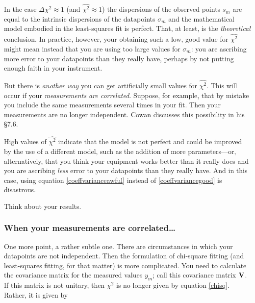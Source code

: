 \documentclass[psfig,preprint]{aastex}
\begin{document}
	In the case $\Delta \chi^2 \approx 1$ (and $\widehat{\chi^2}
\approx 1$) the dispersions of the observed points $s_m$ are equal to
the intrinsic dispersions of the datapoints $\sigma_{m}$ and the
mathematical model embodied in the least-squares fit is perfect.  That,
at least, is the {\it theoretical} conclusion.  In practice, however,
your obtaining such a low, good value for $\widehat{\chi^2}$ might mean
instead that you are using too large values for $\sigma_{m}$:
you are ascribing more error to your datapoints than they really have,
perhaps by not putting enough faith in your instrument.  

	But there is {\it another way} you can get artificially
small values for $\widehat{\chi^2}$. This will occur if your {\it
measurements are correlated}. Suppose, for example, that by mistake you
include the same measurements several times in your fit. Then your
measurements are no longer independent. Cowan discusses this possibility
in his \S 7.6.

	High values of $\widehat{\chi^2}$ indicate that the model
is not perfect and could be improved by the use of a different model,
such as the addition of more parameters---or, alternatively, that you
think your equipment works better than it really does and you are
ascribing {\it less} error to your datapoints than they really have. And
in this case, using equation \ref{coeffvarianceawful} instead of
\ref{coeffvariancegood} is disastrous.

	Think about your results.

\subsubsection{When your measurements are correlated\dots}

	One more point, a rather subtle one.  There are circumstances
in which your datapoints are not independent.  Then the formulation
of chi-square fitting (and least-squares fitting, for that matter) is
more complicated.  You need to calculate the covariance matrix for the
measured values $y_m$; call this covariance matrix ${\bf V}$.  If this
matrix is not unitary, then $\chi^2$ is no longer given by equation
\ref{chisq}.  Rather, it is given by
\end{document}
